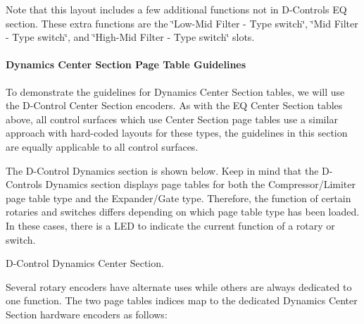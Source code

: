 Note that this layout includes a few additional functions not in D-\/\+Control\textquotesingle{}s EQ section. These extra functions are the \char`\"{}\+Low-\/\+Mid Filter -\/ Type switch\char`\"{}, \char`\"{}\+Mid Filter -\/ Type switch\char`\"{}, and \char`\"{}\+High-\/\+Mid Filter -\/ Type switch\char`\"{} slots.

\hypertarget{a00833_aax_page_table_guide_04_avid_center_section_page_tables_guidelines_dyn}{}\paragraph{Dynamics Center Section Page Table Guidelines}\label{a00833_aax_page_table_guide_04_avid_center_section_page_tables_guidelines_dyn}
 To demonstrate the guidelines for Dynamics Center Section tables, we will use the D-\/\+Control Center Section encoders. As with the EQ Center Section tables above, all control surfaces which use Center Section page tables use a similar approach with hard-\/coded layouts for these types, the guidelines in this section are equally applicable to all control surfaces.

The D-\/\+Control Dynamics section is shown below. Keep in mind that the D-\/\+Control\textquotesingle{}s Dynamics section displays page tables for both the Compressor/\+Limiter page table type and the Expander/\+Gate type. Therefore, the function of certain rotaries and switches differs depending on which page table type has been loaded. In these cases, there is a L\+ED to indicate the current function of a rotary or switch.

  D-\/\+Control Dynamics Center Section. 

Several rotary encoders have alternate uses while others are always dedicated to one function. The two page tables\textquotesingle{} indices map to the dedicated Dynamics Center Section hardware encoders as follows\+:


